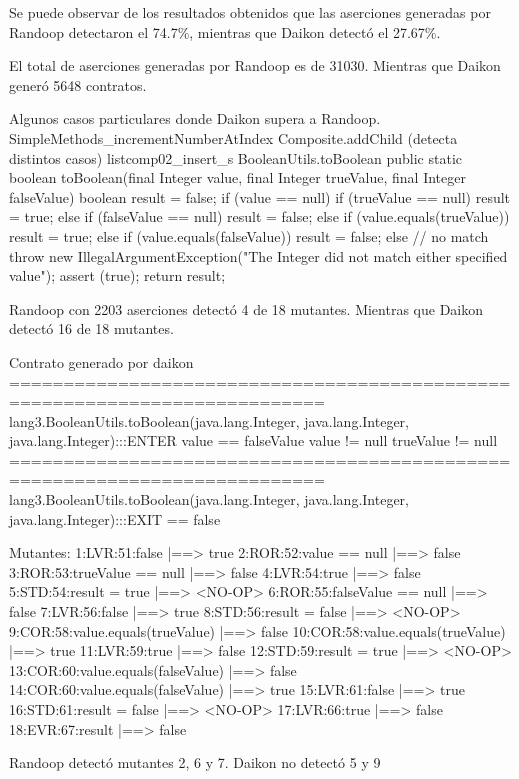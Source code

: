 \vspace{10pt}


Se puede observar de los resultados obtenidos que las aserciones generadas por Randoop detectaron el 74.7\%, mientras que Daikon detectó el 27.67\%. 

El total de aserciones generadas por Randoop es de 31030.
Mientras que Daikon generó 5648 contratos.

Algunos casos particulares donde Daikon supera a Randoop.
SimpleMethods_incrementNumberAtIndex
Composite.addChild (detecta distintos casos)
listcomp02_insert_s
BooleanUtils.toBoolean
public static boolean toBoolean(final Integer value, final Integer trueValue, final Integer falseValue) {
  boolean result = false;
  if (value == null) {
    if (trueValue == null) {
        result = true;
    } else if (falseValue == null) {
        result = false;
    }
  } else if (value.equals(trueValue)) {
      result = true;
  } else if (value.equals(falseValue)) {
      result = false;
  } else {
    // no match
    throw new IllegalArgumentException("The Integer did not match either specified value");
  }
  assert (true);
  return result;
}


Randoop con 2203 aserciones detectó 4 de 18 mutantes.
Mientras que Daikon detectó 16 de 18 mutantes.

Contrato generado por daikon
===========================================================================
lang3.BooleanUtils.toBoolean(java.lang.Integer, java.lang.Integer, java.lang.Integer):::ENTER
value == falseValue
value != null
trueValue != null
===========================================================================
lang3.BooleanUtils.toBoolean(java.lang.Integer, java.lang.Integer, java.lang.Integer):::EXIT
\result == false


Mutantes:
1:LVR:51:false |==> true
2:ROR:52:value == null |==> false
3:ROR:53:trueValue == null |==> false
4:LVR:54:true |==> false
5:STD:54:result = true |==> <NO-OP>
6:ROR:55:falseValue == null |==> false
7:LVR:56:false |==> true
8:STD:56:result = false |==> <NO-OP>
9:COR:58:value.equals(trueValue) |==> false
10:COR:58:value.equals(trueValue) |==> true
11:LVR:59:true |==> false
12:STD:59:result = true |==> <NO-OP>
13:COR:60:value.equals(falseValue) |==> false
14:COR:60:value.equals(falseValue) |==> true
15:LVR:61:false |==> true
16:STD:61:result = false |==> <NO-OP>
17:LVR:66:true |==> false
18:EVR:67:result |==> false

Randoop detectó mutantes 2, 6 y 7.
Daikon no detectó 5 y 9 
